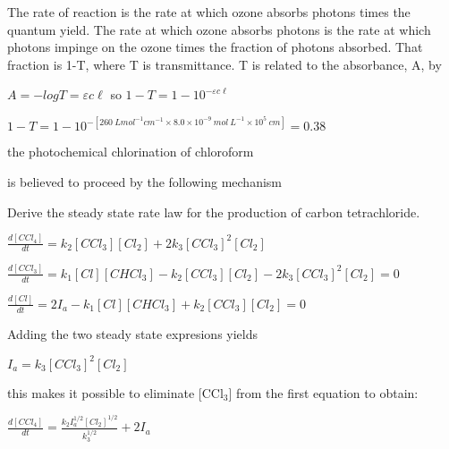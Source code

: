\documentclass[a4paper,12pt,titlepage]{article}
\begin{document}
\begin{Answer}[ref= ex1] The rate of reaction is the rate at which ozone absorbs photons times the quantum yield. The rate at which ozone absorbs photons is the rate at which photons impinge on the ozone times the fraction of photons absorbed. That fraction is 1-T, where T is transmittance. T is related to the absorbance, A, by

\(A=-logT = \varepsilon c \ell\) so \(1-T = 1-10^{-\varepsilon c \ell}\)

\(1-T = 1-10^{-[260\ Lmol^{-1}cm^{-1} \times 8.0\times10^{-9}\ mol\ L^{-1} \times 10^5\ cm]} = 0.38\)

\end{Answer}

\begin{Exercise}[label=ex2]
the photochemical chlorination of chloroform


is believed to proceed by the following mechanism





Derive the steady state rate law for the production of carbon tetrachloride.
\end{Exercise}

\begin{Answer}[ref=ex2]
\(\frac{d[CCl_4]}{dt} = k_2[CCl_3][Cl_2] + 2k_3[CCl_3]^2[Cl_2]\)

\(\frac{d[CCl_3]}{dt} = k_1[Cl][CHCl_3] - k_2[CCl_3][Cl_2] - 2k_3[CCl_3]^2[Cl_2] = 0\)

\(\frac{d[Cl]}{dt} = 2I_a - k_1[Cl][CHCl_3] + k_2[CCl_3][Cl_2] = 0\)

Adding the two steady state expresions yields

\(I_a = k_3[CCl_3]^2[Cl_2]\)

this makes it possible to eliminate [CCl\(_3\)] from the first equation to obtain:

\(\frac{d[CCl_4]}{dt} = \frac{k_2I_a^{1/2}[Cl_2]^{1/2}}{k_3^{1/2}} + 2I_a\)
\end{Answer}



\begin{frame}
\end{frame}
\end{document}
